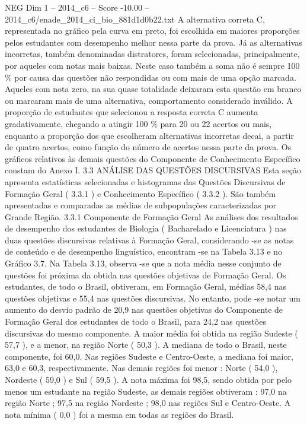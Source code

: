 \begin{textsample}{NEG Dim 1 – 2014\_c6 – Score -10.00 – 2014\_c6/enade\_2014\_ci\_bio\_881d1d0b22.txt}
A alternativa correta C, representada no gráfico pela curva em preto, foi escolhida em maiores proporções pelos estudantes com desempenho melhor nessa parte da prova.
Já as alternativas incorretas, também denominadas distratores, foram selecionadas, principalmente, por aqueles com notas mais baixas.
Neste caso também a soma não é sempre 100 \% por causa das questões não respondidas ou com mais de uma opção marcada.
Aqueles com nota zero, na sua quase totalidade deixaram esta questão em branco ou marcaram mais de uma alternativa, comportamento considerado inválido.
A proporção de estudantes que selecionou a resposta correta C aumenta gradativamente, chegando a atingir 100 \% para 20 ou 22 acertos ou mais, enquanto a proporção dos que escolheram alternativas incorretas decai, a partir de quatro acertos, como função do número de acertos nessa parte da prova.
Os gráficos relativos às demais questões do Componente de Conhecimento Específico constam do Anexo I. 3.3 ANÁLISE DAS QUESTÕES DISCURSIVAS Esta seção apresenta estatísticas selecionadas e histogramas das Questões Discursivas de Formação Geral ( 3.3.1 ) e Conhecimento Específico ( 3.3.2 ).
São também apresentadas e comparadas as médias de subpopulações caracterizadas por Grande Região. 3.3.1 Componente de Formação Geral As análises dos resultados de desempenho dos estudantes de Biologia ( Bacharelado e Licenciatura ) nas duas questões discursivas relativas à Formação Geral, considerando -se as notas de conteúdo e de desempenho linguístico, encontram -se na Tabela 3.13 e no Gráfico 3.7.
Na Tabela 3.13, observa -se que a nota média nesse conjunto de questões foi próxima da obtida nas questões objetivas de Formação Geral.
Os estudantes, de todo o Brasil, obtiveram, em Formação Geral, médias 58,4 nas questões objetivas e 55,4 nas questões discursivas.
No entanto, pode -se notar um aumento do desvio padrão de 20,9 nas questões objetivas do Componente de Formação Geral dos estudantes de todo o Brasil, para 24,2 nas questões discursivas do mesmo componente.
A maior média foi obtida na região Sudeste ( 57,7 ), e a menor, na região Norte ( 50,3 ).
A mediana de todo o Brasil, neste componente, foi 60,0.
Nas regiões Sudeste e Centro-Oeste, a mediana foi maior, 63,0 e 60,3, respectivamente.
Nas demais regiões foi menor : Norte ( 54,0 ), Nordeste ( 59,0 ) e Sul ( 59,5 ).
A nota máxima foi 98,5, sendo obtida por pelo menos um estudante na região Sudeste, as demais regiões obtiveram : 97,0 na região Norte ; 97,5 na região Nordeste ; 98,0 nas regiões Sul e Centro-Oeste.
A nota mínima ( 0,0 ) foi a mesma em todas as regiões do Brasil.

\end{textsample}

